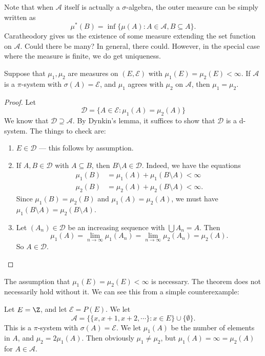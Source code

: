\documentclass[a4paper]{article}
\begin{document}
Note that when $\mathcal{A}$ itself is actually a $\sigma$-algebra, the outer measure can be simply written as
\[
  \mu^*(B) = \inf \{\mu(A): A \in \mathcal{A}, B \subseteq A\}.
\]
Caratheodory gives us the existence of some measure extending the set function on $\mathcal{A}$. Could there be many? In general, there could. However, in the special case where the measure is finite, we do get uniqueness.
\begin{thm}
  Suppose that $\mu_1, \mu_2$ are measures on $(E, \mathcal{E})$ with $\mu_1(E) = \mu_2(E) < \infty$. If $\mathcal{A}$ is a $\pi$-system with $\sigma(A) = \mathcal{E}$, and $\mu_1$ agrees with $\mu_2$ on $\mathcal{A}$, then $\mu_1 = \mu_2$.
\end{thm}

\begin{proof}
  Let
  \[
    \mathcal{D} = \{A \in \mathcal{E}: \mu_1(A) = \mu_2(A)\}
  \]
  We know that $\mathcal{D} \supseteq \mathcal{A}$. By Dynkin's lemma, it suffices to show that $\mathcal{D}$ is a d-system. The things to check are:
  \begin{enumerate}
    \item $E \in \mathcal{D}$ --- this follows by assumption.
    \item If $A, B \in \mathcal{D}$ with $A \subseteq B$, then $B \setminus A \in \mathcal{D}$. Indeed, we have the equations
      \begin{align*}
        \mu_1(B) &= \mu_1(A) + \mu_1(B \setminus A) < \infty\\
        \mu_2(B) &= \mu_2(A) + \mu_2(B \setminus A) < \infty.
      \end{align*}
      Since $\mu_1(B) = \mu_2(B)$ and $\mu_1(A) = \mu_2(A)$, we must have $\mu_1(B \setminus A) = \mu_2(B \setminus A)$.
    \item Let $(A_n) \in \mathcal{D}$ be an increasing sequence with $\bigcup A_n = A$. Then
      \[
        \mu_1(A) = \lim_{n \to \infty}\mu_1(A_n) = \lim_{n \to \infty} \mu_2(A_n) = \mu_2(A).
      \]
      So $A \in\mathcal{D}$.\qedhere
  \end{enumerate}
\end{proof}
The assumption that $\mu_1(E) = \mu_2(E) < \infty$ is necessary. The theorem does not necessarily hold without it. We can see this from a simple counterexample:

\begin{eg}
  Let $E = \Z$, and let $\mathcal{E} = P(E)$. We let
  \[
    \mathcal{A} = \{\{x, x+1, x+2, \cdots\}: x \in E\} \cup \{\emptyset\}.
  \]
  This is a $\pi$-system with $\sigma(A) = \mathcal{E}$. We let $\mu_1(A)$ be the number of elements in $A$, and $\mu_2 = 2\mu_1(A)$. Then obviously $\mu_1 \not= \mu_2$, but $\mu_1(A) = \infty = \mu_2(A)$ for $A \in \mathcal{A}$.
\end{eg}
\end{document}
